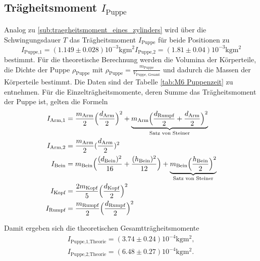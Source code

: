 \subsection{Trägheitsmoment $I_\text{Puppe}$}

\noindent Analog zu \ref{sub:traegheitsmoment_eines_zylinders} wird über die Schwingungsdauer $T$ das Trägheitsmoment $I_\text{Puppe}$ für beide Positionen zu
\begin{subequations}
	\begin{equation}
		\label{wert:Puppe1}
		I_\text{Puppe,1}=(1.149\pm0.028)10^{-3} \si{\kilo\gram\meter\squared}
	\end{equation}
	\begin{equation}
		\label{wert:Puppe2}
		I_\text{Puppe,2}=(1.81\pm0.04)10^{-3} \si{\kilo\gram\meter\squared}
	\end{equation}
\end{subequations}
bestimmt.
Für die theoretische Berechnung werden die Volumina der Körperteile, die Dichte der Puppe $\rho_\text{Puppe}$ 
mit $\rho_\text{Puppe}=\frac{m_\text{Puppe}}{V_\text{Puppe, Gesamt}}$ und dadurch die Massen der Körperteile bestimmt. 
Die Daten sind der Tabelle \ref{tab:M6 Puppenzeit} zu entnehmen.
Für die Einzelträgheitsmomente, deren Summe das Trägheitsmoment der Puppe ist, gelten die Formeln
\begin{align*}
	I_\text{Arm,1} &= \frac{m_\text{Arm}}{2}\Bigl(\frac{d_\text{Arm}}{2}\Bigr)^2+\underbrace{m_\text{Arm}\Bigl(\frac{d_\text{Rumpf}}{2}+\frac{d_\text{Arm}}{2}\Bigr)^2}_{\text{Satz von Steiner}}\\
	I_\text{Arm,2} &= \frac{m_\text{Arm}}{2}(\frac{d_\text{Arm}}{2})^2\\
	I_\text{Bein} &= m_\text{Bein}\Bigl(\frac{(d_\text{Bein})^2}{16}+\frac{(h_\text{Bein})^2}{12}\Bigr)+
	\underbrace{m_\text{Bein}\Bigl(\frac{h_\text{Bein}}{2}\Bigr)^2}_{\text{Satz von Steiner}}\\
	I_\text{Kopf} &= \frac{2m_\text{Kopf}}{5}\Bigl(\frac{d_\text{Kopf}}{2}\Bigr)^2\\
	I_\text{Rumpf} &= \frac{m_\text{Rumpf}}{2}\Bigl(\frac{d_\text{Rumpf}}{2}\Bigr)^2
\end{align*}
\begin{landscape}
	\centering
	
	
\end{landscape}

\noindent Damit ergeben sich die theoretischen Gesamtträgheitsmomente 
\begin{subequations}
	\label{wert:Puppe1T}
	\begin{align}
		I_\text{Puppe,1,Theorie}=(3.74\pm0.24)10^{-4}  \si{\kilo\gram\meter\squared},\\
		I_\text{Puppe,2,Theorie}=(6.48\pm0.27)10^{-4} \si{\kilo\gram\meter\squared}.
	\end{align}
\end{subequations}
